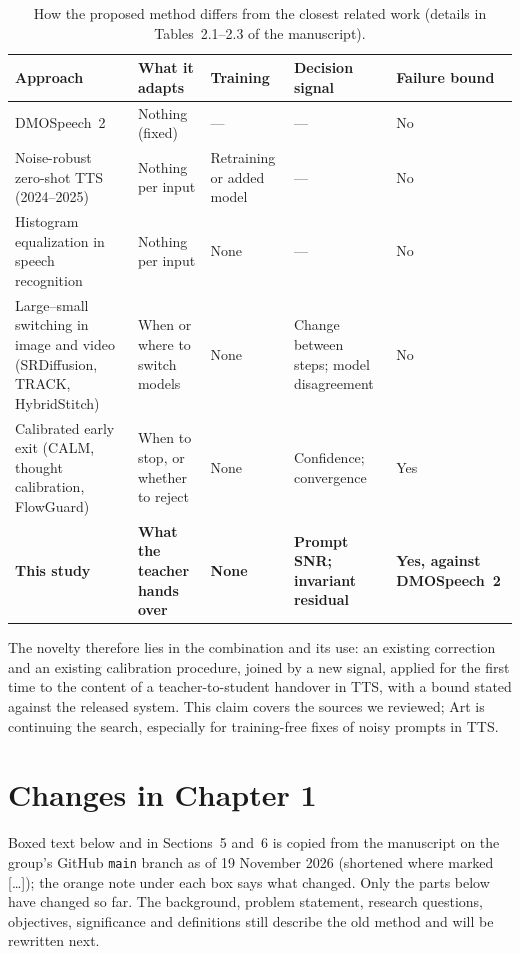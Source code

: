 \documentclass[11pt,a4paper]{article}
\begin{document}
\begin{table}[H]
\centering\small
\caption{How the proposed method differs from the closest related work (details in Tables~2.1--2.3 of the manuscript).}
\label{tab:novelty}
\begin{tabularx}{\textwidth}{@{}P{3.6cm} P{2.6cm} P{1.6cm} L P{1.7cm}@{}}
\toprule
\textbf{Approach} & \textbf{What it adapts} & \textbf{Training} & \textbf{Decision signal} & \textbf{Failure bound} \\
\midrule
DMOSpeech~2 & Nothing (fixed) & --- & --- & No \\
Noise-robust zero-shot TTS (2024--2025) & Nothing per input & Retraining or added model & --- & No \\
Histogram equalization in speech recognition & Nothing per input & None & --- & No \\
Large--small switching in image and video (SRDiffusion, TRACK, HybridStitch) & When or where to switch models & None & Change between steps; model disagreement & No \\
Calibrated early exit (CALM, thought calibration, FlowGuard) & When to stop, or whether to reject & None & Confidence; convergence & Yes \\
\textbf{This study} & \textbf{What the teacher hands over} & \textbf{None} & \textbf{Prompt SNR; invariant residual} & \textbf{Yes, against DMOSpeech~2} \\
\bottomrule
\end{tabularx}
\end{table}

The novelty therefore lies in the combination and its use: an existing correction and an existing calibration procedure, joined by a new signal, applied for the first time to the content of a teacher-to-student handover in TTS, with a bound stated against the released system. This claim covers the sources we reviewed; Art is continuing the search, especially for training-free fixes of noisy prompts in TTS.

\section{Changes in Chapter 1}

Boxed text below and in Sections~5 and~6 is copied from the manuscript on the group's GitHub \texttt{main} branch as of 19 November 2026 (shortened where marked [\dots]); the orange note under each box says what changed. Only the parts below have changed so far. The background, problem statement, research questions, objectives, significance and definitions still describe the old method and will be rewritten next.
\end{document}
